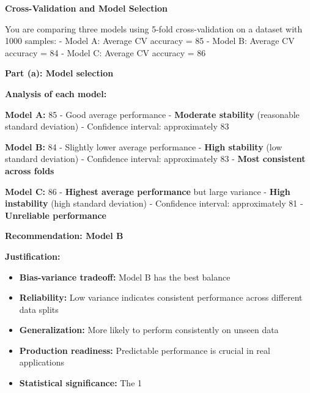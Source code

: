 \documentclass{../../common/quals-template}
\begin{document}
\begin{questions}
\question[4] \textbf{Cross-Validation and Model Selection}

You are comparing three models using 5-fold cross-validation on a dataset with 1000 samples:
- Model A: Average CV accuracy = 85%
- Model B: Average CV accuracy = 84%
- Model C: Average CV accuracy = 86%


\begin{solution}
\textbf{Part (a): Model selection}

\textbf{Analysis of each model:}

\textbf{Model A:} 85%
- Good average performance
- \textbf{Moderate stability} (reasonable standard deviation)
- Confidence interval: approximately 83%

\textbf{Model B:} 84%
- Slightly lower average performance
- \textbf{High stability} (low standard deviation)
- Confidence interval: approximately 83%
- \textbf{Most consistent across folds}

\textbf{Model C:} 86%
- \textbf{Highest average performance} but large variance
- \textbf{High instability} (high standard deviation)
- Confidence interval: approximately 81%
- \textbf{Unreliable performance}

\textbf{Recommendation: Model B}

\textbf{Justification:}
\begin{itemize}
\item \textbf{Bias-variance tradeoff:} Model B has the best balance
\item \textbf{Reliability:} Low variance indicates consistent performance across different data splits
\item \textbf{Generalization:} More likely to perform consistently on unseen data
\item \textbf{Production readiness:} Predictable performance is crucial in real applications
\item \textbf{Statistical significance:} The 1%
\end{itemize}


\end{solution}
\end{questions}
\end{document}
